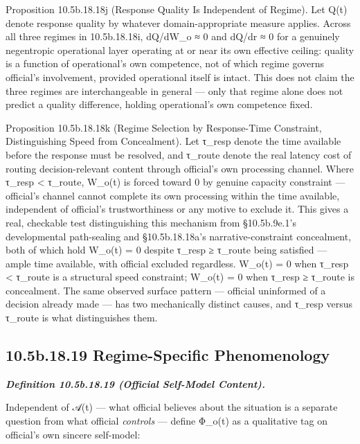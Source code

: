 \documentclass[
]{article}
\begin{document}
Proposition 10.5b.18.18j (Response Quality Is Independent of Regime).
Let Q(t) denote response quality by whatever domain-appropriate measure
applies. Across all three regimes in 10.5b.18.18i, dQ/dW\_o ≈ 0 and
dQ/dr ≈ 0 for a genuinely negentropic operational layer operating at or
near its own effective ceiling: quality is a function of operational's
own competence, not of which regime governs official's involvement,
provided operational itself is intact. This does not claim the three
regimes are interchangeable in general --- only that regime alone does
not predict a quality difference, holding operational's own competence
fixed.

Proposition 10.5b.18.18k (Regime Selection by Response-Time Constraint,
Distinguishing Speed from Concealment). Let τ\_resp denote the time
available before the response must be resolved, and τ\_route denote the
real latency cost of routing decision-relevant content through
official's own processing channel. Where τ\_resp \textless{} τ\_route,
W\_o(t) is forced toward 0 by genuine capacity constraint --- official's
channel cannot complete its own processing within the time available,
independent of official's trustworthiness or any motive to exclude it.
This gives a real, checkable test distinguishing this mechanism from
§10.5b.9e.1's developmental path-sealing and §10.5b.18.18a's
narrative-constraint concealment, both of which hold W\_o(t) = 0 despite
τ\_resp ≥ τ\_route being satisfied --- ample time available, with
official excluded regardless. W\_o(t) = 0 when τ\_resp \textless{}
τ\_route is a structural speed constraint; W\_o(t) = 0 when τ\_resp ≥
τ\_route is concealment. The same observed surface pattern --- official
uninformed of a decision already made --- has two mechanically distinct
causes, and τ\_resp versus τ\_route is what distinguishes them.

\hypertarget{b.18.19-regime-specific-phenomenology}{%
\subsection{10.5b.18.19 Regime-Specific
Phenomenology}\label{b.18.19-regime-specific-phenomenology}}

\emph{\textbf{Definition 10.5b.18.19 (Official Self-Model Content).}}

Independent of 𝒜(t) --- what official believes about the situation is a
separate question from what official \emph{controls} --- define Φ\_o(t)
as a qualitative tag on official's own sincere self-model:
\end{document}
